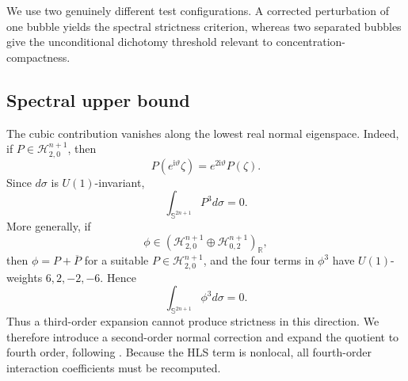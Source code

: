 \documentclass[10pt,a4paper]{amsart}
\begin{document}
We use two genuinely different test configurations. A corrected perturbation of one bubble yields the spectral strictness criterion, whereas two separated bubbles give the unconditional dichotomy threshold relevant to concentration-compactness.



\begingroup
\subsection{Spectral upper bound}\label{sec41}
\begingroup
The cubic contribution vanishes along the lowest real normal eigenspace. Indeed, if \(P\in\mathcal H_{2,0}^{n+1}\), then
\[
P(e^{\mathrm i\vartheta}\zeta)=e^{2\mathrm i\vartheta}P(\zeta).
\]
Since \(d\sigma\) is \(U(1)\)-invariant,
\[
\int_{\mathbb S^{2n+1}}P^3d\sigma=0.
\]
More generally, if
\[
\phi\in(\mathcal H_{2,0}^{n+1}\oplus\mathcal H_{0,2}^{n+1})_{\mathbb R},
\]
then \(\phi=P+\overline P\) for a suitable \(P\in\mathcal H_{2,0}^{n+1}\), and the four terms in \(\phi^3\) have \(U(1)\)-weights \(6,2,-2,-6\). Hence
\[
\int_{\mathbb S^{2n+1}}\phi^3d\sigma=0.
\]
Thus a third-order expansion cannot produce strictness in this direction. We therefore introduce a second-order normal correction and expand the quotient to fourth order, following \cite[Proposition~6.4]{Li26}. Because the HLS term is nonlocal, all fourth-order interaction coefficients must be recomputed.
\endgroup
\end{document}
